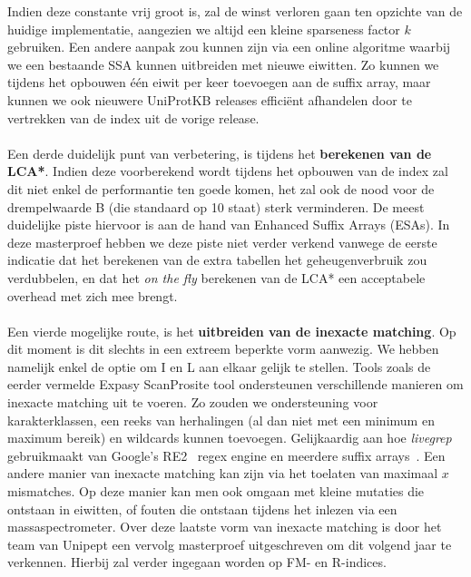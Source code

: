 Indien deze constante vrij groot is, zal de winst verloren gaan ten opzichte van de huidige implementatie, aangezien we altijd een kleine sparseness factor $k$ gebruiken.
Een andere aanpak zou kunnen zijn via een online algoritme waarbij we een bestaande SSA kunnen uitbreiden met nieuwe eiwitten.
Zo kunnen we tijdens het opbouwen één eiwit per keer toevoegen aan de suffix array, maar kunnen we ook nieuwere UniProtKB releases efficiënt afhandelen door te vertrekken van de index uit de vorige release.
\\ \\
Een derde duidelijk punt van verbetering, is tijdens het \textbf{berekenen van de LCA*}.
Indien deze voorberekend wordt tijdens het opbouwen van de index zal dit niet enkel de performantie ten goede komen, het zal ook de nood voor de drempelwaarde B (die standaard op 10 staat) sterk verminderen.
De meest duidelijke piste hiervoor is aan de hand van Enhanced Suffix Arrays (ESAs).
In deze masterproef hebben we deze piste niet verder verkend vanwege de eerste indicatie dat het berekenen van de extra tabellen het geheugenverbruik zou verdubbelen, en dat het \textit{on the fly} berekenen van de LCA* een acceptabele overhead met zich mee brengt.
\\ \\
Een vierde mogelijke route, is het \textbf{uitbreiden van de inexacte matching}.
Op dit moment is dit slechts in een extreem beperkte vorm aanwezig.
We hebben namelijk enkel de optie om I en L aan elkaar gelijk te stellen.
Tools zoals de eerder vermelde Expasy ScanProsite tool ondersteunen verschillende manieren om inexacte matching uit te voeren.
Zo zouden we ondersteuning voor karakterklassen, een reeks van herhalingen (al dan niet met een minimum en maximum bereik) en wildcards kunnen toevoegen.
Gelijkaardig aan hoe \textit{livegrep}~\cite{livegrep} gebruikmaakt van Google's RE2~\cite{re2} regex engine en meerdere suffix arrays~\cite{regex_sa}.
Een andere manier van inexacte matching kan zijn via het toelaten van maximaal $x$ mismatches.
Op deze manier kan men ook omgaan met kleine mutaties die ontstaan in eiwitten, of fouten die ontstaan tijdens het inlezen via een massaspectrometer.
Over deze laatste vorm van inexacte matching is door het team van Unipept een vervolg masterproef uitgeschreven om dit volgend jaar te verkennen.
Hierbij zal verder ingegaan worden op FM- en R-indices.